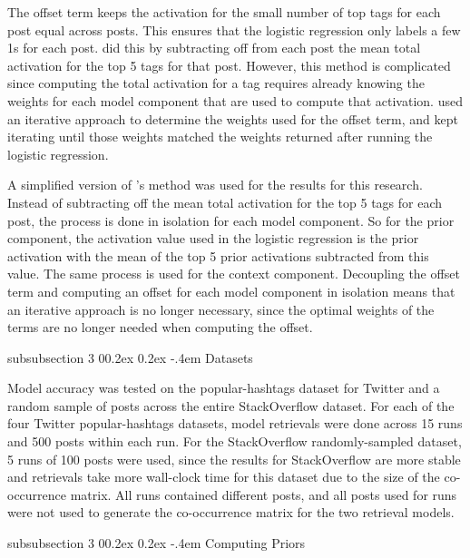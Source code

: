\documentclass[man,floatsintext,donotrepeattitle]{apa6}
\makeatletter
\renewcommand{\subsubsection}{%
  \@startsection
  {subsubsection}%
  {3}%
  {\parindent}%
  {0\baselineskip \@plus 0.2ex \@minus 0.2ex}%
  {-.4em}%
  {\normalfont\normalsize\bfseries\addperi}}
\makeatother
\begin{document}
The offset term keeps the activation for the small number of top tags for each post equal across posts.
This ensures that the logistic regression only labels a few 1s for each post.
\textcite{Stanley2013} did this by subtracting off from each post the mean total activation for the top 5 tags for that post.
However, this method is complicated since computing the total activation for a tag requires already knowing the weights for each model component that are used to compute that activation.
\citeauthor{Stanley2013} used an iterative approach to determine the weights used for the offset term, and kept iterating until those weights matched the weights returned after running the logistic regression.

A simplified version of \textcite{Stanley2013}'s method was used for the results for this research.
Instead of subtracting off the mean total activation for the top 5 tags for each post, the process is done in isolation for each model component.
So for the prior component, the activation value used in the logistic regression is the prior activation with the mean of the top 5 prior activations subtracted from this value.
The same process is used for the context component.
Decoupling the offset term and computing an offset for each model component in isolation means that an iterative approach is no longer necessary,
since the optimal weights of the terms are no longer needed when computing the offset.

\subsubsection{Datasets}

Model accuracy was tested on the popular-hashtags dataset for Twitter and a random sample of posts across the entire StackOverflow dataset.
For each of the four Twitter popular-hashtags datasets, model retrievals were done across 15 runs and 500 posts within each run.
For the StackOverflow randomly-sampled dataset, 5 runs of 100 posts were used,
since the results for StackOverflow are more stable and retrievals take more wall-clock time for this dataset due to the size of the co-occurrence matrix.
All runs contained different posts, and all posts used for runs were not used to generate the co-occurrence matrix for the two retrieval models.

\subsubsection{Computing Priors}
\end{document}
